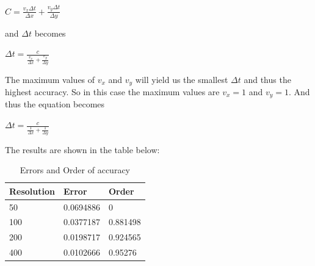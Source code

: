 \documentclass[12pt]{article}
\begin{document}
\begin{center}
$C = \frac{v_x \Delta t}{\Delta x}+ \frac{v_y \Delta t}{\Delta y}$
\end{center}
and $\Delta t$ becomes
\begin{center}
$\Delta t = \frac{c}{\frac{v_{x}}{\Delta x}+ \frac{v_{y}}{\Delta y}}$
\end{center}
The maximum values of $v_{x}$ and $v_{y}$ will yield us the smallest $\Delta t$ and thus the highest accuracy. So in this case the maximum values are $v_{x} = 1$ and $v_{y} = 1$. And thus the equation becomes
\begin{center}
$\Delta t = \frac{c}{\frac{1}{\Delta x}+ \frac{1}{\Delta y}}$
\end{center}
The results are shown in the table below:
\begin{table}[bht]
\centering


\begin{tabular}{|l|l|l|}
\hline
Resolution & Error     & Order    \\ \hline
50         & 0.0694886 & 0        \\ \hline
100        & 0.0377187 & 0.881498 \\ \hline
200        & 0.0198717 & 0.924565 \\ \hline
400        & 0.0102666 & 0.95276  \\ \hline
\end{tabular}
\caption{Errors and Order of accuracy}
\label{Problem 1a}
\end{table}
\newpage
\end{document}
